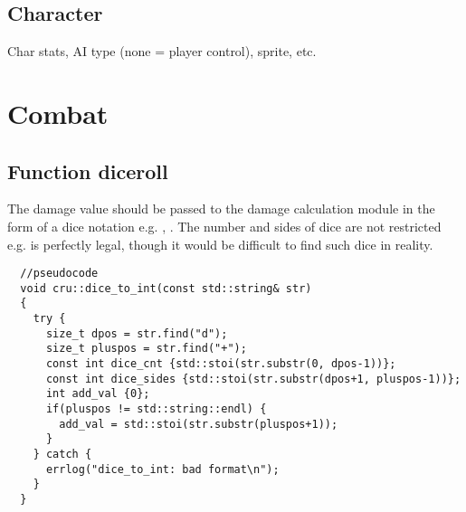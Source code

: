 \documentclass[a4paper,10pt]{book}
\begin{document}
\section{\enginenamespace{}Character}
Char stats, AI type (none = player control), sprite, etc.
\TODO{}
\chapter{Combat}
\section{Function \enginenamespace{}diceroll}
The damage value should be passed to the damage calculation module in the form
of a dice notation e.g. , .
The number and sides of dice are not restricted e.g.  is perfectly legal,
though it would be difficult to find such dice in reality.
\begin{verbatim}
  //pseudocode
  void cru::dice_to_int(const std::string& str)
  {
    try {
      size_t dpos = str.find("d");
      size_t pluspos = str.find("+");
      const int dice_cnt {std::stoi(str.substr(0, dpos-1))};
      const int dice_sides {std::stoi(str.substr(dpos+1, pluspos-1))};
      int add_val {0};
      if(pluspos != std::string::endl) {
        add_val = std::stoi(str.substr(pluspos+1));
      }
    } catch {
      errlog("dice_to_int: bad format\n");
    }
  }
\end{verbatim}
\end{document}
